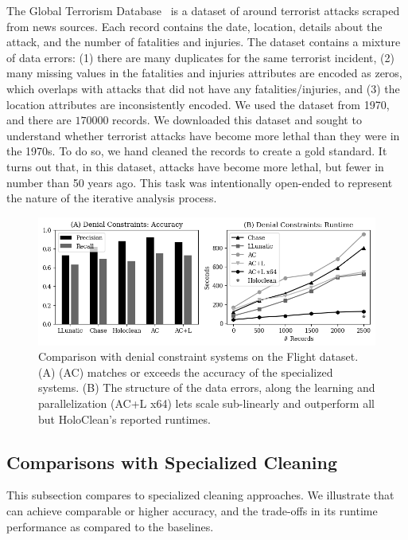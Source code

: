  The Global Terrorism Database~\cite{data-terrorism} is a dataset of around terrorist attacks scraped from news sources.  Each record contains the date, location, details about the attack, and the number of fatalities and injuries.  The dataset contains a mixture of data errors:
(1) there are many duplicates for the same terrorist incident,
(2) many missing values in the fatalities and injuries attributes are encoded as zeros, which overlaps with attacks that did not have any fatalities/injuries, and
(3) the location attributes are inconsistently encoded.  
We used the dataset from 1970, and there are $170000$ records.  
We downloaded this dataset and sought to understand whether terrorist attacks have become more lethal than they were in the 1970s.  To do so, we hand cleaned the records to create a gold standard.  It turns out that, in this dataset, attacks have become more lethal, but fewer in number than 50 years ago.  This task was intentionally open-ended to represent the nature of the iterative analysis process.



\begin{figure}
    \centering
    \includegraphics[width=\columnwidth]{exp/exp1.png}
    \caption{\small Comparison with denial constraint systems on the Flight dataset.  (A) \sys (AC) matches or exceeds the accuracy of the specialized systems.  (B) The structure of the data errors, along the learning and parallelization (AC+L x64) lets \sys scale sub-linearly and outperform all but HoloClean's reported runtimes.  \label{exp1a}}
\end{figure}

\subsection{Comparisons with Specialized Cleaning}
This subsection compares \sys to specialized cleaning approaches.  We illustrate that \sys can achieve comparable or higher accuracy, and the trade-offs in its runtime performance as compared to the baselines.

